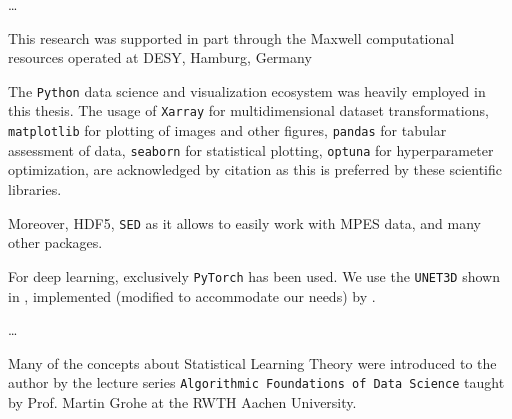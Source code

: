 \dots

This research was supported in part through the Maxwell computational resources operated at \gls{DESY}, Hamburg, Germany

The \texttt{Python} data science and visualization ecosystem was heavily employed in this thesis.
The usage of \texttt{Xarray} \cite{hoyerXarrayNDLabeled2017} for multidimensional dataset transformations, \texttt{matplotlib} \cite{hunterMatplotlib2DGraphics2007} for plotting of images and other figures, \texttt{pandas} \cite{thepandasdevelopmentteamPandasdevPandasPandas2024} for tabular assessment of data, \texttt{seaborn} \cite{waskomSeabornStatisticalData2021} for statistical plotting, \texttt{optuna} \cite{akibaOptunaNextgenerationHyperparameter2019} for hyperparameter optimization, are acknowledged by citation as this is preferred by these scientific libraries. 



Moreover, HDF5, \texttt{SED} as it allows to easily work with \gls{MPES} data, and many other packages.

For deep learning, exclusively \texttt{PyTorch} \cite{paszkePyTorchImperativeStyle2019} has been used. We use the \texttt{UNET3D} shown in \cite{cicek3DUNetLearning2016}, implemented (modified to accommodate our needs) by \citeauthor{wolnyAccurateVersatile3D2020} \cite{wolnyAccurateVersatile3D2020}.


\dots

Many of the concepts about Statistical Learning Theory were introduced to the author by the lecture series \texttt{Algorithmic Foundations of Data Science} taught by Prof. Martin Grohe at the RWTH Aachen University.
